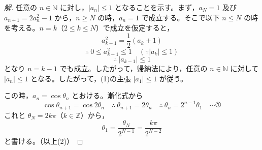 \documentclass[../main.tex]{subfiles}
\begin{document}
\begin{proof}[解]
  任意の $n\in\mathbb{N}$ に対し，$|a_n|\le1$ となることを示す。まず，$a_N=1$ 及び $a_{n+1}=2a_n^2-1$ から，$n\ge N$ の時，$a_n=1$ で成立する。そこで以下 $n\le N$ の時を考える。$n=k$（$2\le k\le N$）で成立を仮定すると，
  \[
    a_{k-1}^2=\frac12(a_k+1)
  \]
  \[
    \therefore\ 0\le a_{k-1}^2\le1 \quad (\because|a_k|\le1)
  \]
  \[
    \therefore\ |a_{k-1}|\le1
  \]
  となり $n=k-1$ でも成立。したがって，帰納法により，任意の $n\in\mathbb{N}$ に対して $|a_n|\le1$ となる。したがって，(1)の主張 $|a_1|\le1$ が従う。

  この時，$a_n=\cos\theta_n$ とおける。漸化式から
  \[
    \cos\theta_{n+1}=\cos2\theta_n \quad\therefore\ \theta_{n+1}=2\theta_n \quad\therefore\ \theta_n=2^{n-1}\theta_1 \quad \cdots \text{①}
  \]
  これと $\theta_N=2k\pi$（$k\in\mathbb{Z}$）から，
  \[
    \theta_1=\frac{\theta_N}{2^{N-1}}=\frac{k\pi}{2^{N-2}}
  \]
  と書ける。（以上(2)）
\end{proof}
\end{document}
